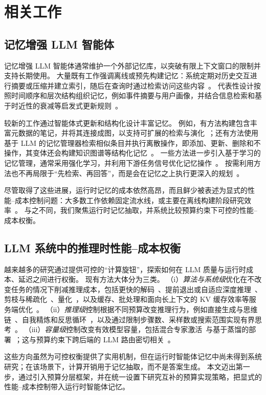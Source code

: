 \section{相关工作}
\label{sec:related}

\subsection{记忆增强 LLM 智能体}

记忆增强 LLM 智能体通常维护一个外部记忆库，以突破有限上下文窗口的限制并支持长期使用。
大量既有工作强调离线或预先构建记忆：系统定期对历史交互进行摘要或压缩并建立索引，随后在查询时通过检索访问这些内容~\citep{zhong2024memorybank, packer2023memgpt, lee2024human, kang2025memory, fang2025lightmem}。
代表性设计按照时间顺序和层次结构组织记忆，例如事件摘要与用户画像，并结合信息检索和基于时近性的衰减等启发式更新规则~\citep{zhong2024memorybank, kang2025memory}。

较新的工作通过智能体式更新和结构化设计丰富记忆。
例如，有方法构建包含丰富元数据的笔记，并将其连接成图，以支持可扩展的检索与演化~\citep{xu2025mem}；还有方法使用基于 LLM 的记忆管理器检索相似条目并执行离散操作，即添加、更新、删除和不操作，其变体还会构建知识图谱等结构化记忆~\citep{chhikara2025mem0}。
一些方法进一步引入基于学习的记忆管理，通常采用强化学习，并利用下游任务信号优化记忆操作~\citep{yan2025memory, wang2025mem}。
按需利用方法也不再局限于“先检索、再回答”，而是会在记忆之上执行更深入的规划~\citep{yan2025general}。

尽管取得了这些进展，运行时记忆的成本依然高昂，而且鲜少被表述为显式的性能--成本控制问题：大多数工作依赖固定流水线，或主要在离线构建阶段研究效率~\citep{fang2025lightmem}。
与之不同，我们聚焦运行时记忆抽取，并系统比较预算约束下可控的性能--成本权衡。

\subsection{LLM 系统中的推理时性能--成本权衡}
\label{sec:related_tradeoff}

越来越多的研究通过提供可控的“计算旋钮”，探索如何在 LLM 质量与运行时成本、延迟之间进行权衡。
现有方法大体分为三类。
（i）\textit{算法与系统级}优化在不改变任务的情况下削减推理成本，包括更快的解码~\citep{fu2024break, cai2024medusa, li2024eagle}、提前退出或自适应深度推理~\citep{schuster2022confident}、剪枝与稀疏化~\citep{ma2023llm, frantar2023sparsegpt, sun2023simple}、量化~\citep{xiao2023smoothquant, liu2024llm}，以及缓存、批处理和面向长上下文的 KV 缓存效率等服务端优化~\citep{zhang2023h2o, xiao2023efficient, ge2023model, li2024snapkv}。
（ii）\textit{推理级}控制根据不同预算改变推理行为，例如直接生成与思维链~\citep{wei2022chain}、自我精炼和反思循环~\citep{yao2022react, shinn2023reflexion, madaan2023self}，以及通过限制步骤数、采样数或搜索范围实现有界思考~\citep{wang2022self}。
（iii）\textit{容量级}控制改变有效模型容量，包括混合专家激活~\citep{shazeer2017outrageously, fedus2022switch}与基于蒸馏的部署~\citep{gu2023minillm, agarwal2024policy}；这与预算约束下跨后端的 LLM 路由密切相关~\citep{chen2024routerdc, feng2024graphrouter, zhang2025router, jin2025controlling}。

这些方向虽然为可控权衡提供了实用机制，但在运行时智能体记忆中尚未得到系统研究；在该场景下，计算开销用于记忆抽取，而不是答案生成。
本文迈出第一步，通过引入预算分层框架，并在统一设置下研究互补的预算实现策略，把显式的性能--成本控制带入运行时智能体记忆。

